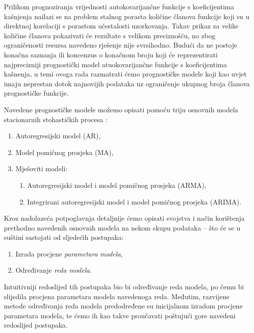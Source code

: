 \documentclass[a4paper,12pt,oneside]{memoir}
\begin{document}
        Prilikom prognoziranja vrijednosti autokovarijančne funkcije s koeficijentima kašnjenja nailazi se na problem stalnog porasta količine članova funkcije koji su u direktnoj korelaciji s porastom učestalosti uzorkovanja. Takav prikaz za velike količine članova pokazivati će rezultate s velikom preciznošću, no zbog ograničenosti resursa navedeno rješenje nije svrsihodno. Budući da ne postoje konačna saznanja ili koncenzus o konačnom broju koji će reprezentirati najprecizniji prognostički model atuokovarijančne funkcije s koeficijentima kašnenja, u temi ovoga rada razmatrati ćemo prognostičke modele koji kao uvjet imaju neprestan dotok najnovijih podataka uz ograničenje ukupnog broja članova prognostičke funkcije.

        Navedene prognostičke modele možemo opisati pomoću triju osnovnih modela stacionarnih stohastičkih procesa \cite{Broersen}:
        
        \begin{enumerate}
            \item Autoregresijski model (AR),
            \item Model pomičnog prosjeka (MA),
            \item Mješoviti modeli:
            \begin{enumerate}
                \item Autoregresijski model i model pomičnog prosjeka (ARMA),
                \item Integrirani autoregresijski model i model pomičnog prosjeka (ARIMA).
            \end{enumerate}
        \end{enumerate}
        
        Kroz nadolazeća potpoglavnja detaljnije ćemo opisati svojstva i način korištenja prethodno navedenih osnovnih modela na nekom skupu podataka -- što će se u suštini sastojati od sljedećih postupaka:
        
        \begin{enumerate}
            \item Izrada procjene \textit{parametara modela},
            \item Određivanje \textit{reda modela}.
        \end{enumerate}

        Intuitivniji redoslijed tih postupaka bio bi određivanje reda modela, po čemu bi slijedila procjena parametara modela navedenoga reda. Međutim, razvijene metode određivanja reda modela predodređene su inicijalnom izradom procjene parametara modela, te ćemo ih kao takve proučavati poštujući gore navedeni redoslijed postupaka. \cite{Priestley}
\end{document}

